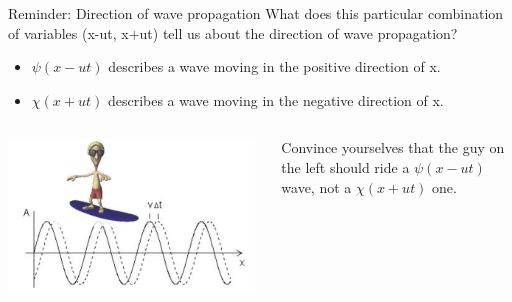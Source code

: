 {\begin{frame}{Reminder: Direction of wave propagation}
What does this particular combination of variables (x-ut, x+ut) tell us about
the direction of wave propagation?
\begin{itemize}
       \item $\psi(x-ut)$ describes a wave moving in the positive direction of x.
       \item $\chi(x+ut)$ describes a wave moving in the negative direction of x.
\end{itemize}

\begin{columns}
  \begin{column}{0.60\textwidth}
     \begin{center}
         \includegraphics[width=0.98\textwidth]{./images/schematics/wave_direction.png}\\
     \end{center}
  \end{column}
  \begin{column}{0.40\textwidth}
  {\scriptsize
     Convince yourselves that the guy on the left should ride a
     $\psi(x-ut)$ wave, not a $\chi(x+ut)$ one.
  }
  \end{column}
\end{columns}

\end{frame}

}%


%
%
%
%

